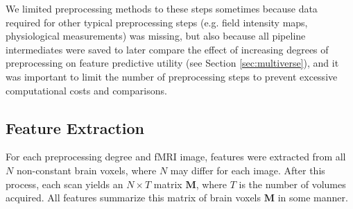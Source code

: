 \documentclass[12pt]{spieman}  %
\begin{document}
\begin{spacing}{2}
We limited preprocessing methods to these steps sometimes because data required
for other typical preprocessing steps (e.g. field intensity maps, physiological
measurements) was missing, but also because all pipeline intermediates were
saved to later compare the effect of increasing degrees of preprocessing on
feature predictive utility (see Section \ref{sec:multiverse}), and it was
important to limit the number of preprocessing steps to prevent excessive
computational costs and comparisons.



\subsection{Feature Extraction}


For each preprocessing degree and fMRI image, features were extracted from all
\(N\) non-constant brain voxels, where \(N\) may differ for each image. After
this process, each scan yields an \(N \times T\) matrix \(\mathbf{M}\), where
\(T\) is the number of volumes acquired. All features summarize this matrix
of brain voxels \(\mathbf{M}\) in some manner.


\end{spacing}
\end{document}
